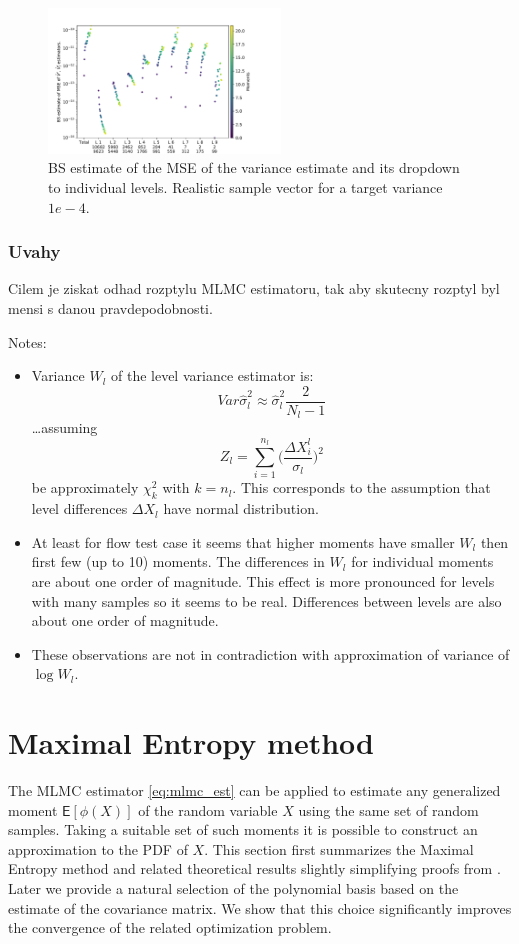 \documentclass{article}
\def \E{{\mathsf E}}
\begin{document}
\begin{figure}
 \includegraphics[width=0.55\textwidth]{bs_var_var_composition.pdf}
 \caption{BS estimate of the MSE of the variance estimate and its dropdown to individual levels. Realistic sample vector for a target variance $1e-4$.}
 \label{fig:bs_var_var_comp}
\end{figure}


\subsubsection{Uvahy}
Cilem je ziskat odhad rozptylu MLMC estimatoru, tak aby skutecny rozptyl byl mensi s danou pravdepodobnosti. 

Notes:
\begin{itemize}
    \item Variance $W_l$ of the level variance estimator is:
    \[
        Var \hat\sigma_l^2 \approx \hat\sigma_l^2 \frac{2}{N_l - 1}
    \]
    \dots assuming
    \[
    Z_l = \sum_{i=1}^{n_l}\Big(\frac{\Delta X^l_i}{\sigma_l}\Big)^2
    \]
    be approximately $\chi^2_k$ with $k=n_l$. This corresponds to the assumption that level differences $\Delta X_l$ have normal distribution. 
    \item At least for flow test case it seems that higher moments have smaller $W_l$ then first few (up to 10) moments. The differences in $W_l$ for individual moments are about one order of magnitude.  This effect is more pronounced for levels with many samples so it seems to be real. Differences between levels are also about one order of magnitude.
    \item These observations are not in contradiction with approximation of variance of  $\log W_l$.
\end{itemize}


\section{Maximal Entropy method}\label{mem}

The MLMC estimator \eqref{eq:mlmc_est} can be applied to estimate any generalized moment $\E[\phi(X)]$ 
of the random variable $X$ using the same set of random samples. Taking a suitable 
set of such moments it is possible to construct an approximation to the PDF of $X$. This section first
summarizes the Maximal Entropy method and related theoretical results slightly simplifying proofs from \cite{Barron1991}. Later we provide a natural selection of the polynomial basis based on the estimate of the covariance matrix. We show that this choice significantly improves the convergence of the related optimization problem.
\end{document}
